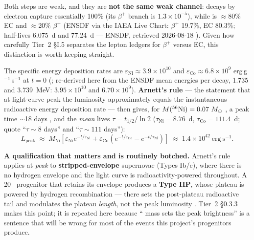 Both steps are weak, and they are \textbf{not the same weak channel}:
 decays by electron capture essentially 100\% (its $\beta^{+}$
branch is $1.3 \times 10^{-5}$), while  is $\approx$80\% EC and
$\approx$20\% $\beta^{+}$ (ENSDF via the IAEA Live Chart: $\beta^{+}$ 19.7\%,
EC 80.3\%; half-lives 6.075~d and 77.24~d --- ENSDF, retrieved 2026-08-18
\citep{ensdf}). Given how carefully Tier~2 \S I.5 separates the lepton ledgers
for $\beta^{+}$ versus EC, this distinction is worth keeping straight.

The specific energy deposition rates are $\varepsilon_{\mathrm{Ni}} \approx 3.9
\times 10^{10}$ and $\varepsilon_{\mathrm{Co}} \approx 6.8 \times 10^{9}$
erg\,g$^{-1}$\,s$^{-1}$ at $t = 0$ (\citealt{nadyozhin1994}; re-derived here
from the ENSDF mean energies per decay, 1.735 and 3.739~MeV: $3.95 \times
10^{10}$ and $6.70 \times 10^{9}$). \textbf{Arnett's rule} \citep{arnett1982}
--- the statement that at light-curve peak the luminosity approximately equals
the instantaneous radioactive energy deposition rate --- then gives, for
$M(\nuc{Ni}{56}) = 0.07~\Msun$ , a peak
time $\sim$18 days , and the \emph{mean} lives $\tau = t_{1/2}/\ln 2$
($\tau_{\mathrm{Ni}} = 8.76$~d, $\tau_{\mathrm{Co}} = 111.4$~d;
\citet{diehl2015} quote ``$\tau \sim 8$ days'' and ``$\tau \sim 111$ days''):
%
\begin{equation}\label{eq:lpeak}
L_{\mathrm{peak}} \;\approx\; M_{\mathrm{Ni}}\left[\varepsilon_{\mathrm{Ni}}e^{-t/\tau_{\mathrm{Ni}}} + \varepsilon_{\mathrm{Co}}\left(e^{-t/\tau_{\mathrm{Co}}} - e^{-t/\tau_{\mathrm{Ni}}}\right)\right]
\;\approx\; 1.4\times10^{42}\ \mathrm{erg\ s^{-1}} .
\end{equation}


\textbf{A qualification that matters and is routinely botched.} Arnett's rule
applies at \emph{peak} to \textbf{stripped-envelope} supernovae (Types Ib/c),
where there is no hydrogen envelope and the light curve is
radioactivity-powered throughout. A 20~\Msun{} progenitor that retains its
envelope produces a \textbf{Type IIP}, whose plateau is powered by hydrogen
recombination \citep{popov1993, kasen2009} --- there  sets the
post-plateau radioactive tail and modulates the plateau \emph{length}, not the
peak luminosity \citep{kasen2009, nakar2016}. Tier~2 \S 0.3.3 makes this point;
it is repeated here because `` mass sets the peak brightness'' is a
sentence that will be wrong for most of the events this project's progenitors
produce.

